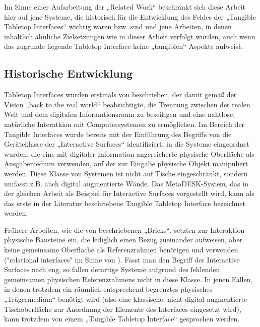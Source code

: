 Im Sinne einer Aufarbeitung der „Related Work“ beschränkt sich diese Arbeit hier auf jene Systeme, die historisch für die Entwicklung des Feldes der „Tangible Tabletop Interfaces“ wichtig waren bzw. sind und jene Arbeiten, in denen inhaltlich ähnliche Zielsetzungen wie in dieser Arbeit verfolgt wurden, auch wenn das zugrunde liegende Tabletop Interface keine „tangiblen“ Aspekte aufweist.

\subsection{Historische Entwicklung} %
\label{sub:historische_entwicklung_von_tabletop_interfaces}

Tabletop Interfaces wurden erstmals von \citet{Wellner93a} beschrieben, der damit gemäß der Vision „back to the real world“ \citet{Wellner93} beabsichtigte, die Trennung zwischen der realen Welt und dem digitalen Inforamtionsraum zu beseitigen und eine nahtlose, natürliche Interatkion mit Computersystemen zu ermöglichen. Im Bereich der Tangible Interfaces wurde bereits mit der Einführung des Begriffs von \citet{Ishii97} die Geräteklasse der „Interactive Surfaces“ identifiziert, in die Systeme eingeordnet wurden, die eine mit digitaler Information angereicherte physische Oberfläche als Ausgabemedium verwenden, auf der zur Eingabe physische Objekt manipuliert werden. Diese Klasse von Systemen ist nicht auf Tische eingeschränkt, sondern umfasst z.B. auch digital augmentierte Wände. Das MetaDESK-System, das in der gleichen Arbeit als Beispiel für Interactive Surfaces vorgestellt wird, kann als das erste in der Literatur beschriebene Tangible Tabletop Interface bezeichnet werden. 

Frühere Arbeiten, wie die von \citet{Fitzmaurice96} beschriebenen „Bricks“, setzten zur Interaktion physische Bausteine ein, die lediglich einen Bezug zueinander aufweisen, aber keine gemeinsame Oberfläche als Referenzrahmen benötigen und verwenden ("relational interfaces" im Sinne von \citet{Ullmer00}). Fasst man den Begriff der Interactive Surfaces nach \citet{Ishii97} eng, so fallen derartige Systeme aufgrund des fehlenden gemeinsamen physischen Referenzrahmens nicht in diese Klasse. In jenen Fällen, in denen trotzdem ein räumlich entsprechend begrenztes physisches „Trägermedium“ benötigt wird (also eine klassische, nicht digital augmentierte Tischoberfläche zur Anordnung der Elemente des Interfaces eingesetzt wird), kann trotzdem von einem „Tangible Tabletop Interface“ gesprochen werden.

